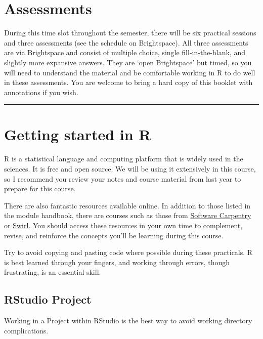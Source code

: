 \documentclass[
  11pt,
  a4paper,
]{book}
\begin{document}
\hypertarget{assessments}{%
\section{Assessments}\label{assessments}}

During this time slot throughout the semester, there will be six practical sessions and three assessments (see the schedule on Brightspace). All three assessments are via Brightspace and consist of multiple choice, single fill-in-the-blank, and slightly more expansive answers. They are `open Brightspace' but timed, so you will need to understand the material and be comfortable working in R to do well in these assessments. You are welcome to bring a hard copy of this booklet with annotations if you wish.

\begin{center}\rule{0.5\linewidth}{0.5pt}\end{center}

\hypertarget{R_intro}{%
\section{Getting started in R}\label{R_intro}}

R is a statistical language and computing platform that is widely used in the sciences. It is free and open source. We will be using it extensively in this course, so I recommend you review your notes and course material from last year to prepare for this course.

There are also fantastic resources available online. In addition to those listed in the module handbook, there are courses such as those from \href{https://swcarpentry.github.io/r-novice-gapminder/}{Software Carpentry} or \href{https://swirlstats.com/}{Swirl}. You should access these resources in your own time to complement, revise, and reinforce the concepts you'll be learning during this course.

Try to avoid copying and pasting code where possible during these practicals. R is best learned through your fingers, and working through errors, though frustrating, is an essential skill.

\hypertarget{rstudio-project}{%
\subsection{RStudio Project}\label{rstudio-project}}

Working in a Project within RStudio is the best way to avoid working directory complications.
\end{document}
